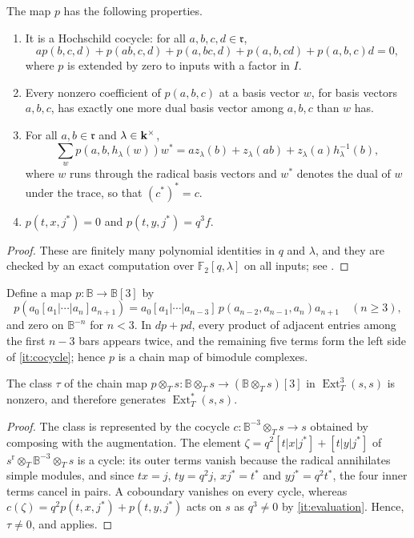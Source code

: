 \begin{lemma}
  \label{lemma:cocycle}
  The map $p$ has the following properties.
  \begin{enumerate}
    \item\label{it:cocycle} It is a Hochschild cocycle: for all
      ${a,b,c,d\in\mathfrak{r}}$,
      \[
        ap(b,c,d)+p(ab,c,d)+p(a,bc,d)+p(a,b,cd)+p(a,b,c)d=0,
      \]
      where $p$ is extended by zero to inputs with a factor in $I$.
    \item\label{it:weight} Every nonzero coefficient of $p(a,b,c)$ at a basis
      vector $w$, for basis vectors $a,b,c$, has exactly one more dual basis
      vector among $a,b,c$ than $w$ has.
    \item\label{it:boundary} For all ${a,b\in\mathfrak{r}}$ and
      ${\lambda\in\mathbf{k}^\times}$,
      \[
        \sum_{w}p(a,b,h_\lambda(w))w^*=az_\lambda(b)+z_\lambda(ab)+
        z_\lambda(a)h_\lambda^{-1}(b),
      \]
      where $w$ runs through the radical basis vectors and $w^*$ denotes the
      dual of $w$ under the trace, so that ${(c^*)^*=c}$.
    \item\label{it:evaluation} ${p(t,x,j^*)=0}$ and ${p(t,y,j^*)=q^3f}$.
  \end{enumerate}
\end{lemma}

\begin{proof}
  These are finitely many polynomial identities in $q$ and $\lambda$, and
  they are checked by an exact computation over $\mathbb{F}_2[q,\lambda]$ on
  all inputs; see .
\end{proof}

Define a map ${p\colon\mathbb{B}\to\mathbb{B}[3]}$ by
\[
  p(a_0[a_1|\cdots|a_n]a_{n+1})=a_0[a_1|\cdots|a_{n-3}]\,
  p(a_{n-2},a_{n-1},a_n)a_{n+1}\quad(n\geq3),
\]
and zero on $\mathbb{B}^{-n}$ for ${n<3}$. In ${dp+pd}$, every product of adjacent
entries among the first ${n-3}$ bars appears twice, and the remaining five terms
form the left side of \eqref{it:cocycle}; hence $p$ is a
chain map of bimodule complexes.

\begin{proposition}
  \label{prop:cocycle-generator}
  The class $\tau$ of the chain map ${p\otimes_Ts\colon\mathbb{B}\otimes_Ts\to
  (\mathbb{B}\otimes_Ts)[3]}$ in $\operatorname{Ext}^3_T(s,s)$ is nonzero, and
  therefore generates $\operatorname{Ext}^*_T(s,s)$.
\end{proposition}

\begin{proof}
  The class is represented by the cocycle
  ${c\colon\mathbb{B}^{-3}\otimes_Ts\to s}$ obtained by composing with the
  augmentation. The element
  ${\zeta=q^2[t|x|j^*]+[t|y|j^*]}$ of ${s^{\mathrm{r}}\otimes_T\mathbb{B}^{-3}
  \otimes_Ts}$ is a cycle: its outer terms vanish because the radical
  annihilates simple modules, and since ${tx=j}$, ${ty=q^2j}$, ${xj^*=t^*}$ and
  ${yj^*=q^2t^*}$, the four inner terms cancel in pairs. A coboundary vanishes on
  every cycle, whereas ${c(\zeta)=q^2p(t,x,j^*)+p(t,y,j^*)}$ acts on $s$ as
  ${q^3\neq0}$ by \eqref{it:evaluation}. Hence, ${\tau\neq0}$,
  and  applies.
\end{proof}

